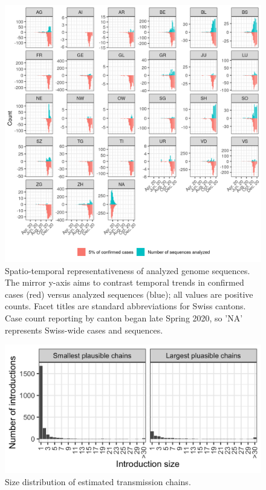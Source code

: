 \documentclass[9pt,twoside,lineno]{pnas-new}
\begin{document}
\begin{figure}
\centering
\includegraphics[width = 11.4cm]{figures/swiss_downsampling.png}
\caption{Spatio-temporal representativeness of analyzed genome sequences. The mirror y-axis aims to contrast temporal trends in confirmed cases (red) versus analyzed sequences (blue); all values are positive counts. Facet titles are standard abbreviations for Swiss cantons. Case count reporting by canton began late Spring 2020, so 'NA' represents Swiss-wide cases and sequences.}  
\label{fig:downsampling_representativeness}
\end{figure}

\begin{figure}
\centering
\includegraphics[width = 11.4cm]{figures/chain_size_dist.png}
\caption{Size distribution of estimated transmission chains.}  
\label{fig:chain_size_dist}
\end{figure}
\end{document}
